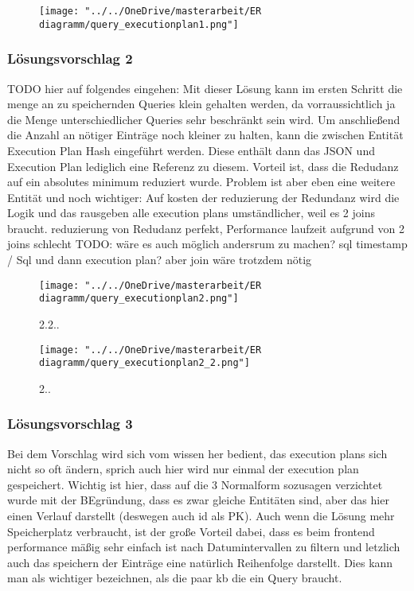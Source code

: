 \begin{figure}
	\centering
	\texttt{[image: "../../OneDrive/masterarbeit/ER diagramm/query\_executionplan1.png"]}
	\caption{}
	\label{fig:devicefeaturetimestamp1solution}
\end{figure}





\subsubsection{Lösungsvorschlag 2}

TODO hier auf folgendes eingehen:
Mit dieser Lösung kann im ersten Schritt die menge an zu speichernden Queries klein gehalten werden, da vorraussichtlich ja die Menge unterschiedlicher Queries sehr beschränkt sein wird. Um anschließend die Anzahl an nötiger Einträge noch kleiner zu halten, kann die zwischen Entität Execution Plan Hash eingeführt werden. Diese enthält dann das JSON und Execution Plan lediglich eine Referenz zu diesem. Vorteil ist, dass die Redudanz auf ein absolutes minimum reduziert wurde. Problem ist aber eben eine weitere Entität und noch wichtiger: Auf kosten der reduzierung der Redundanz wird die Logik und das rausgeben alle execution plans umständlicher, weil es 2 joins braucht.
reduzierung von Redudanz perfekt, Performance laufzeit aufgrund von 2 joins schlecht
TODO: wäre es auch möglich andersrum zu machen?
sql timestamp  / Sql und dann execution plan?
aber join wäre trotzdem nötig

\begin{figure}[h]
	\centering
	\texttt{[image: "../../OneDrive/masterarbeit/ER diagramm/query\_executionplan2.png"]}
	  \caption{2.2..}
	\label{fig:devicefeaturesolution22}
\end{figure}


\begin{figure}[h]
	\centering
	\texttt{[image: "../../OneDrive/masterarbeit/ER diagramm/query\_executionplan2\_2.png"]}
	  \caption{2..}

	\label{fig:devicefeaturehash2solution}
\end{figure}





\subsubsection{Lösungsvorschlag 3}
Bei dem Vorschlag wird sich vom wissen her bedient, das execution plans sich nicht so oft ändern, sprich auch hier wird nur einmal der execution plan gespeichert. Wichtig ist hier, dass auf die 3 Normalform sozusagen verzichtet wurde mit der BEgründung, dass es zwar gleiche Entitäten sind, aber das hier einen Verlauf darstellt (deswegen auch id als PK). Auch wenn die Lösung mehr Speicherplatz verbraucht, ist der große Vorteil dabei, dass es beim frontend performance mäßig sehr einfach ist nach Datumintervallen zu filtern und letzlich auch das speichern der Einträge eine natürlich Reihenfolge darstellt.
Dies kann man als wichtiger bezeichnen, als die paar kb die ein Query braucht.

